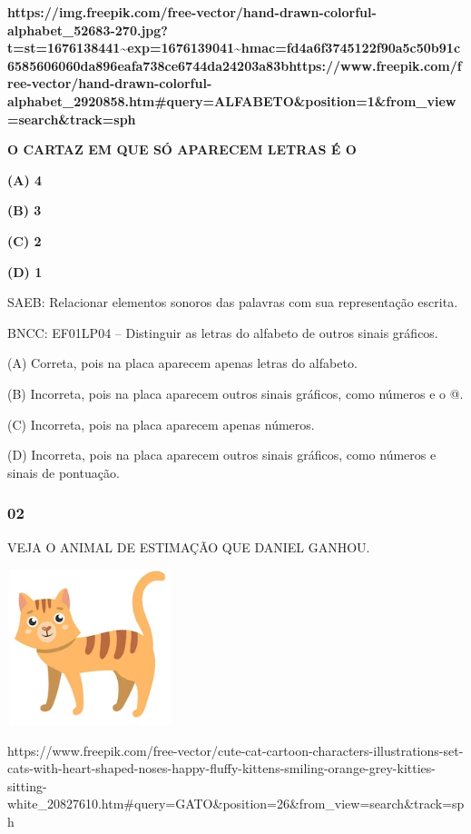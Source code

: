 \textbf{https://img.freepik.com/free-vector/hand-drawn-colorful-alphabet\_52683-270.jpg?t=st=1676138441\textasciitilde{}exp=1676139041\textasciitilde{}hmac=fd4a6f3745122f90a5c50b91c6585606060da896eafa738ce6744da24203a83bhttps://www.freepik.com/free-vector/hand-drawn-colorful-alphabet\_2920858.htm\#query=ALFABETO\&position=1\&from\_view=search\&track=sph}

\textbf{O CARTAZ EM QUE SÓ APARECEM LETRAS É O}

\textbf{(A) 4}

\textbf{(B) 3}

\textbf{(C) 2}

\textbf{(D) 1}

SAEB: Relacionar elementos sonoros das palavras com sua representação escrita.

BNCC: EF01LP04 -- Distinguir as letras do alfabeto de outros
sinais gráficos.

(A) Correta, pois na placa aparecem apenas letras do alfabeto.

(B) Incorreta, pois na placa aparecem outros sinais gráficos, como números
e o @.

(C) Incorreta, pois na placa aparecem apenas números.

(D) Incorreta, pois na placa aparecem outros sinais gráficos, como números
e sinais de pontuação.

\subsubsection{02}\label{section-27}

VEJA O ANIMAL DE ESTIMAÇÃO QUE DANIEL GANHOU.

\includegraphics[width=1.91250in,height=1.79167in]{media/image187.png}

https://www.freepik.com/free-vector/cute-cat-cartoon-characters-illustrations-set-cats-with-heart-shaped-noses-happy-fluffy-kittens-smiling-orange-grey-kitties-sitting-white\_20827610.htm\#query=GATO\&position=26\&from\_view=search\&track=sph

